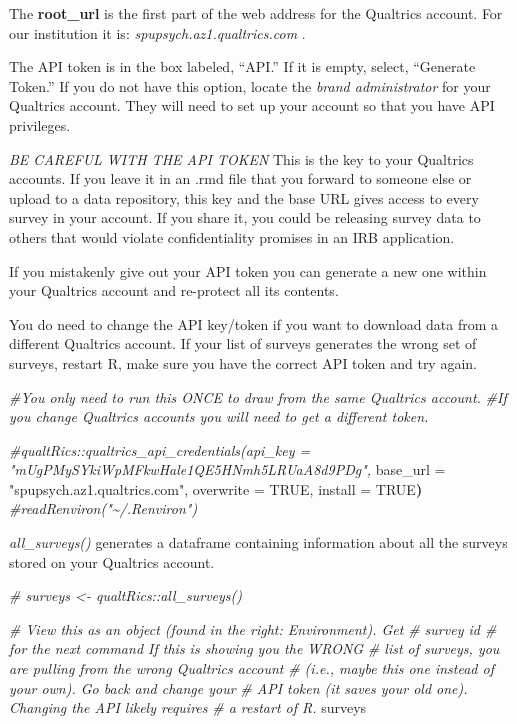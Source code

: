 \documentclass[
  11pt,
]{book}
\newenvironment{Shaded}{\begin{snugshade}}{\end{snugshade}}
\newcommand{\CommentTok}[1]{\textcolor[rgb]{0.37,0.37,0.37}{\textit{#1}}}
\newcommand{\ConstantTok}[1]{\textcolor[rgb]{0.37,0.37,0.37}{#1}}
\newcommand{\ErrorTok}[1]{\textcolor[rgb]{0.14,0.14,0.14}{\textbf{#1}}}
\newcommand{\NormalTok}[1]{#1}
\newcommand{\OtherTok}[1]{\textcolor[rgb]{0.37,0.37,0.37}{#1}}
\newcommand{\StringTok}[1]{\textcolor[rgb]{0.5,0.5,0.5}{#1}}
\begin{document}
The \textbf{root\_url} is the first part of the web address for the Qualtrics account. For our institution it is: \emph{spupsych.az1.qualtrics.com }.

The API token is in the box labeled, ``API.'' If it is empty, select, ``Generate Token.'' If you do not have this option, locate the \emph{brand administrator} for your Qualtrics account. They will need to set up your account so that you have API privileges.

\emph{BE CAREFUL WITH THE API TOKEN} This is the key to your Qualtrics accounts. If you leave it in an .rmd file that you forward to someone else or upload to a data repository, this key and the base URL gives access to every survey in your account. If you share it, you could be releasing survey data to others that would violate confidentiality promises in an IRB application.

If you mistakenly give out your API token you can generate a new one within your Qualtrics account and re-protect all its contents.

You do need to change the API key/token if you want to download data from a different Qualtrics account. If your list of surveys generates the wrong set of surveys, restart R, make sure you have the correct API token and try again.

\begin{Shaded}
\begin{Highlighting}[]
\CommentTok{\#You only need to run this ONCE to draw from the same Qualtrics account.}
\CommentTok{\#If you change Qualtrics accounts you will need to get a different token. }

\CommentTok{\#qualtRics::qualtrics\_api\_credentials(api\_key = "mUgPMySYkiWpMFkwHale1QE5HNmh5LRUaA8d9PDg",}
\NormalTok{              base\_url }\OtherTok{=} \StringTok{"spupsych.az1.qualtrics.com"}\NormalTok{, overwrite }\OtherTok{=} \ConstantTok{TRUE}\NormalTok{, install }\OtherTok{=} \ConstantTok{TRUE}\ErrorTok{)}
\CommentTok{\#readRenviron("\textasciitilde{}/.Renviron")}
\end{Highlighting}
\end{Shaded}

\emph{all\_surveys()} generates a dataframe containing information about all the surveys stored on your Qualtrics account.

\begin{Shaded}
\begin{Highlighting}[]
\CommentTok{\# surveys \textless{}{-} qualtRics::all\_surveys()}

\CommentTok{\# View this as an object (found in the right: Environment).  Get}
\CommentTok{\# survey id \# for the next command If this is showing you the WRONG}
\CommentTok{\# list of surveys, you are pulling from the wrong Qualtrics account}
\CommentTok{\# (i.e., maybe this one instead of your own). Go back and change your}
\CommentTok{\# API token (it saves your old one). Changing the API likely requires}
\CommentTok{\# a restart of R.}
\NormalTok{surveys}
\end{Highlighting}
\end{Shaded}
\end{document}
